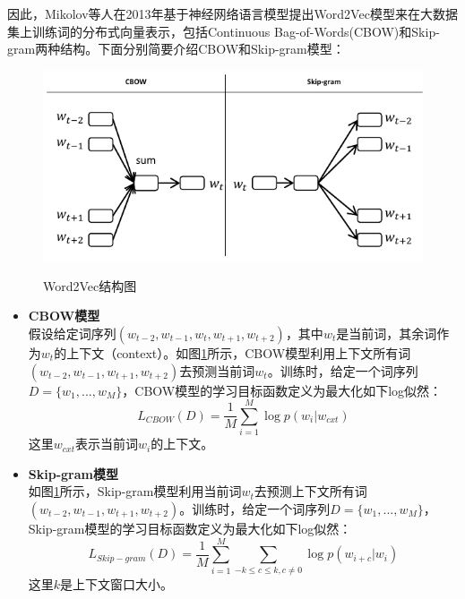 \documentclass[master]{njuthesis}
\begin{document}
因此，Mikolov等人在2013年基于神经网络语言模型提出Word2Vec模型来在大数据集上训练词的分布式向量表示\cite{mikolov2013efficient,mikolov2013distributed,mikolov2013linguistic}，包括Continuous Bag-of-Words(CBOW)和Skip-gram两种结构。下面分别简要介绍CBOW和Skip-gram模型：

\begin{figure}[htbp]
  \centering
  \includegraphics[width= 1.0\textwidth]{figures//word2vec_chap2.pdf}\\
  \caption{Word2Vec结构图}\label{fig:word2vec}
\end{figure}

\begin{itemize}
\item \textbf{CBOW模型}\\
	假设给定词序列$(w_{t-2}, w_{t-1}, w_t, w_{t+1}, w_{t+2})$，其中$w_t$是当前词，其余词作为$w_t$的上下文（context）。如图\ref{fig:word2vec}所示，CBOW模型利用上下文所有词$(w_{t-2}, w_{t-1}, w_{t+1}, w_{t+2})$去预测当前词$w_t$。训练时，给定一个词序列$D=\{w_1, ..., w_M\}$，CBOW模型的学习目标函数定义为最大化如下log似然：
		\begin{equation}\label{eq:cbow}
		{L}_{CBOW}(D)=\frac{1}{M}\sum_{i=1}^{M}\log p(w_{i}|w_{cxt})
		\end{equation}
	这里$w_{cxt}$表示当前词$w_i$的上下文。
\item \textbf{Skip-gram模型}\\
	如图\ref{fig:word2vec}所示，Skip-gram模型利用当前词$w_t$去预测上下文所有词$(w_{t-2}, w_{t-1}, w_{t+1}, w_{t+2})$。训练时，给定一个词序列$D=\{w_1, ..., w_M\}$，Skip-gram模型的学习目标函数定义为最大化如下log似然：
		\begin{equation}\label{eq:skip-gram}
		{L}_{Skip-gram}(D)=\frac{1}{M}\sum_{i=1}^{M}\sum_{-k\leq c\leq k,c\neq 0}\log p(w_{i+c}|w_{i})
		\end{equation}
	这里$k$是上下文窗口大小。
\end{itemize}
\end{document}
